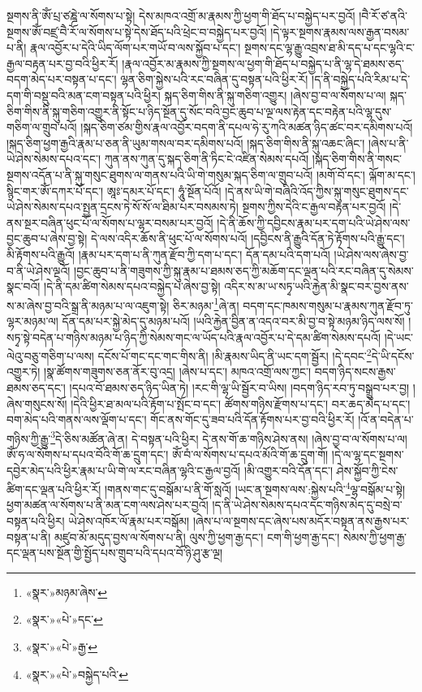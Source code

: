 སྔགས་ནི་ཨོཾ་པྲ་ཙཎྜེ་ལ་སོགས་པ་སྟེ། དེས་མཁའ་འགྲོ་མ་རྣམས་ཀྱི་ཕྱག་གི་ཐོད་པ་བསྐྱེད་པར་བྱའོ། །བཻ་རོ་ཙ་ནའི་སྔགས་ཨོཾ་བཛྲ་བཻ་རོ་ལ་སོགས་པ་སྟེ་དེས་ཐོད་པའི་ཕྲེང་བ་བསྐྱེད་པར་བྱའོ། །དེ་ལྟར་སྔགས་རྣམས་ལས་རྒྱན་བསམ་པ་ནི། རྣལ་འབྱོར་པ་དེའི་ཡིད་ལོག་པར་གཡོ་བ་ལས་སྐྱོབ་པ་དང་། སྔགས་དང་ལྷ་རྒྱུ་འབྲས་ཐ་མི་དད་པ་དང་ལྷའི་ང་རྒྱལ་བརྟན་པར་བྱ་བའི་ཕྱིར་རོ། །རྣལ་འབྱོར་མ་རྣམས་ཀྱི་སྔགས་ལ་ཕྱག་གི་ཐོད་པ་བསྐྱེད་པ་ནི་ལྷ་དེ་ཐམས་ཅད་བདག་མེད་པར་བསྟན་པ་དང་། ལྷན་ཅིག་སྐྱེས་པའི་རང་བཞིན་དུ་བསྟན་པའི་ཕྱིར་རོ། །ད་ནི་བསྐྱེད་པའི་རིམ་པ་དེ་དག་གི་བསྡུ་བའི་མན་ངག་བསྟན་པའི་ཕྱིར། སྐད་ཅིག་གིས་ནི་སྐུ་གཅིག་འགྱུར། །ཞེས་བྱ་བ་ལ་སོགས་པ་ལ། སྐད་ཅིག་གིས་ནི་སྐུ་གཅིག་འགྱུར་ནི་སྟོང་པ་ཉིད་སྔོན་དུ་སོང་བའི་བྱང་ཆུབ་པ་ལྔ་ལས་རྟེན་དང་བརྟེན་པའི་ལྷ་དུས་གཅིག་ལ་གྲུབ་པའོ། །སྐད་ཅིག་ཙམ་གྱིས་རྣལ་འབྱོར་བདག་ནི་དཔལ་ཧེ་རུ་ཀའི་མཚན་ཉིད་ཚང་བར་དམིགས་པའོ། །སྐད་ཅིག་ཕྱག་རྒྱའི་རྣམ་པ་ཅན་ནི་ཡུམ་གསལ་བར་དམིགས་པའོ། །སྐད་ཅིག་གིས་ནི་སྐུ་འཆང་ཞིང་། །ཞེས་པ་ནི་ཡེ་ཤེས་སེམས་དཔའ་དང་། ཀུན་ནས་ཀུན་དུ་སྐད་ཅིག་ནི་ཏིང་ངེ་འཛིན་སེམས་དཔའོ། །སྐད་ཅིག་གིས་ནི་གསང་སྔགས་འདོན་པ་ནི་སྐུ་གསུང་ཐུགས་ལ་གནས་པའི་ཡི་གེ་གསུམ་སྐད་ཅིག་ལ་གྲུབ་པའོ། །མགོ་བོ་དང་། ལྐོག་མ་དང་། སྙིང་གར་ཨོཾ་དཀར་པོ་དང་། ཨཱཿ་དམར་པོ་དང་། ཧཱུཾ་སྔོན་པོའོ། །དེ་ནས་ཡི་གེ་བཞིའི་འོད་ཀྱིས་སྐུ་གསུང་ཐུགས་དང་ཡེ་ཤེས་སེམས་དཔའ་སྤྱན་དྲངས་ཏེ་སོ་སོ་ལ་ཐིམ་པར་བསམས་ཏེ། སྔགས་ཀྱིས་དེའི་ང་རྒྱལ་བརྟན་པར་བྱའོ། །དེ་ནས་སྔར་བཞིན་ཕུང་པོ་ལ་སོགས་པ་ལྷར་བསམ་པར་བྱའོ། །དེ་ནི་ཆོས་ཀྱི་དབྱིངས་རྣམ་པར་དག་པའི་ཡེ་ཤེས་ལས་བྱང་ཆུབ་པ་ཞེས་བྱ་སྟེ། དེ་ལས་འདིར་ཆོས་ནི་ཕུང་པོ་ལ་སོགས་པའོ། །དབྱིངས་ནི་རྒྱུའི་དོན་ཏེ་རྟོགས་པའི་རྒྱུ་དང་། མི་རྟོགས་པའི་རྒྱུའོ། །རྣམ་པར་དག་པ་ནི་ཀུན་རྫོབ་ཀྱི་དག་པ་དང་། དོན་དམ་པའི་དག་པའོ། །ཡེ་ཤེས་ལས་ཞེས་བྱ་བ་ནི་ཡེ་ཤེས་ལྔའོ། །བྱང་ཆུབ་པ་ནི་གཟུགས་ཀྱི་སྐུ་རྣམ་པ་ཐམས་ཅད་ཀྱི་མཆོག་དང་ལྡན་པའི་རང་བཞིན་དུ་སེམས་སྣང་བའོ། །དེ་ནི་དམ་ཚིག་སེམས་དཔའ་བསྐྱེད་པ་ཞེས་བྱ་སྟེ། འདིར་ས་མ་ཡ་སཏྭ་ཡའི་རྐྱེན་མི་སྣང་བར་བྱས་ནས་ས་མ་ཞེས་བྱ་བའི་སྒྲ་ནི་མཉམ་པ་ལ་འཇུག་སྟེ། ཅིར་མཉམ་\footnote{«སྣར་»མཉམ་ཞེས་}ཞེ་ན། བདག་དང་ཁམས་གསུམ་པ་རྣམས་ཀུན་རྫོབ་ཏུ་ལྷར་མཉམ་ལ། དོན་དམ་པར་སྐྱེ་མེད་དུ་མཉམ་པའོ། །ཡའི་རྐྱེན་བྱིན་ན་འདའ་བར་མི་བྱ་བ་སྟེ་མཉམ་ཉིད་ལས་སོ། །སཏྭ་སྟེ་བདེན་པ་གཉིས་མཉམ་པ་ཉིད་ཀྱི་སེམས་གང་ལ་ཡོད་པའི་རྣལ་འབྱོར་པ་དེ་དམ་ཚིག་སེམས་དཔའོ། །དེ་ཡང་ལེའུ་བཅུ་གཅིག་པ་ལས། དངོས་པོ་གང་དང་གང་གིས་ནི། །མི་རྣམས་ཡིད་ནི་ཡང་དག་སྦྱོར། །དེ་དབང་\footnote{«སྣར་»«པེ་»དང་}དེ་ཡི་དངོས་འགྱུར་ཏེ། །སྣ་ཚོགས་གཟུགས་ཅན་ནོར་བུ་འདྲ། །ཞེས་པ་དང་། མཁའ་འགྲོ་ལས་ཀྱང་། བདག་ཉིད་སངས་རྒྱས་ཐམས་ཅད་དང་། །དཔའ་བོ་ཐམས་ཅད་ཉིད་ཡིན་ཏེ། །རང་གི་ལྷ་ཡི་སྦྱོར་བ་ཡིས། །བདག་ཉིད་རབ་ཏུ་བསྒྲུབ་པར་བྱ། །ཞེས་གསུངས་སོ། །དེའི་ཕྱིར་ཐ་མལ་པའི་རྟོག་པ་སྤོང་བ་དང་། ཚོགས་གཉིས་རྫོགས་པ་དང་། བར་ཆད་མེད་པ་དང་། བག་མེད་པའི་གནས་ལས་ལྡོག་པ་དང་། གོང་ནས་གོང་དུ་ཟབ་པའི་དོན་རྟོགས་པར་བྱ་བའི་ཕྱིར་རོ། །འོ་ན་བདེན་པ་གཉིས་ཀྱི་རྒྱུ་\footnote{«སྣར་»«པེ་»རྒྱ་}དེ་ཅིས་མཚོན་ཞེ་ན། དེ་བསྟན་པའི་ཕྱིར། དེ་ནས་གོ་ཆ་གཉིས་ཤེས་ནས། །ཞེས་བྱ་བ་ལ་སོགས་པ་ལ། ཨོཾ་ཧ་ལ་སོགས་པ་དཔའ་བོའི་གོ་ཆ་དྲུག་དང་། ཨོཾ་བཾ་ལ་སོགས་པ་དཔའ་མོའི་གོ་ཆ་དྲུག་གོ། །དེ་ལ་ལྷ་དང་སྔགས་དབྱེར་མེད་པའི་ཕྱིར་རྣམ་པ་ཡི་གེ་ལ་རང་བཞིན་ལྷའི་ང་རྒྱལ་བྱའོ། །མི་འགྱུར་བའི་དོན་དང་། ཤེས་སྐྱོབ་ཀྱི་ངེས་ཚིག་དང་ལྡན་པའི་ཕྱིར་རོ། །གནས་གང་དུ་བསྒོམ་པ་ནི་གོ་སླའོ། །ཡང་ན་སྔགས་ལས་:སྐྱེས་པའི་\footnote{«སྣར་»«པེ་»བསྐྱེད་པའི་}ལྷ་བསྒོམ་པ་སྟེ། ཕྱག་མཚན་ལ་སོགས་པ་ནི་མན་ངག་ལས་ཤེས་པར་བྱའོ། །ད་ནི་ཡེ་ཤེས་སེམས་དཔའ་དང་གཉིས་མེད་དུ་བསྲེ་བ་བསྟན་པའི་ཕྱིར། ཡེ་ཤེས་འཁོར་ལོ་རྣམ་པར་བསྒོམ། །ཞེས་པ་ལ་སྔགས་དང་ཞེས་པས་མདོར་བསྟན་ནས་རྒྱས་པར་བསྟན་པ་ནི། མཛུབ་མོ་མདུད་བྱས་ལ་སོགས་པ་ནི། ལུས་ཀྱི་ཕྱག་རྒྱ་དང་། ངག་གི་ཕྱག་རྒྱ་དང་། སེམས་ཀྱི་ཕྱག་རྒྱ་དང་ལྡན་པས་སྔོན་གྱི་སྤྱོད་པས་གྲུབ་པའི་དཔའ་བོ་ཉི་ཤུ་རྩ་ལྔ། 